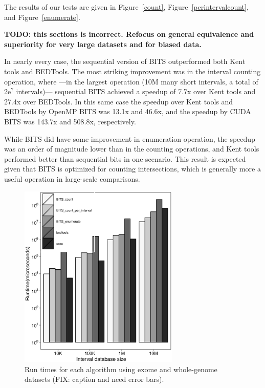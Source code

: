 \documentclass{bioinfo}
\begin{document}
		The results of our tests are given in Figure~\ref{count},
		Figure~\ref{perintervalcount}, and Figure~\ref{enumerate}.
		
		\textbf{TODO: this sections is incorrect.  Refocus on general equivalence
		and superiority for very large datasets and for biased data.}
		
		In nearly every case, the sequential version of BITS outperformed both Kent
		tools and BEDTools.  The most striking improvement was in the interval counting
		operation, where ---in the largest operation (10M many short intervals, a total
		of 2e$^7$ intervals)--- sequential BITS achieved a speedup of 7.7x over Kent
		tools and 27.4x over BEDTools.  In this same case the speedup over Kent tools
		and BEDTools by OpenMP BITS was 13.1x and 46.6x, and the speedup by CUDA BITS
		was 143.7x and 508.8x, respectively.

		While BITS did have some improvement in enumeration operation, the speedup was
		an order of magnitude lower than in the counting operations, and Kent tools
		performed better than sequential bits in one scenario.  This result is expected
		given that BITS is optimized for counting intersections, which is generally more
		a useful operation in large-scale comparisons.

		\begin{figure}[h]
			\centering
			\includegraphics[width=3in]{figures/genome-v-exome.eps}
			\caption[]{Run times for each algorithm using exome and whole-genome datasets (FIX: caption and need error bars).}
		\end{figure}
		
\end{document}
